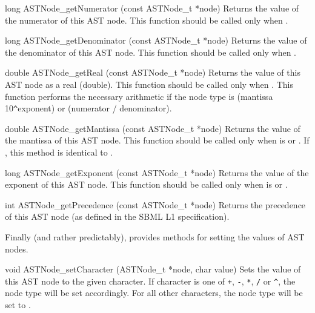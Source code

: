 \documentclass{sbmlmanual}
\begin{document}
\begin{methoddef}{long ASTNode\_getNumerator (const ASTNode\_t *node)}
  Returns the value of the numerator of this AST node.  This function
  should be called only when .
\end{methoddef}


\begin{methoddef}{long ASTNode\_getDenominator (const ASTNode\_t *node)}
  Returns the value of the denominator of this AST node.  This function
  should be called only when .
\end{methoddef}


\begin{methoddef}{double ASTNode\_getReal (const ASTNode\_t *node)}
  Returns the value of this AST node as a real (double).  This function
  should be called only when .
  This function performs the necessary arithmetic if the node type is
   (mantissa  10\verb|^|exponent) or 
  (numerator / denominator).
\end{methoddef}


\begin{methoddef}{double ASTNode\_getMantissa (const ASTNode\_t *node)}
  Returns the value of the mantissa of this AST node.  This function should
  be called only when  is 
  or .  If , this method is identical to
  .
\end{methoddef}


\begin{methoddef}{long ASTNode\_getExponent (const ASTNode\_t *node)}
  Returns the value of the exponent of this AST node.  This function should
  be called only when  is 
  or .
\end{methoddef}


\begin{methoddef}{int ASTNode\_getPrecedence (const ASTNode\_t *node)}
  Returns the precedence of this AST node (as defined in the SBML L1
  specification).
\end{methoddef}


Finally (and rather predictably), \libsbml{} provides methods for setting
the values of AST nodes.


\begin{methoddef}{void ASTNode\_setCharacter (ASTNode\_t *node, char value)}
  Sets the value of this AST node to the given character.  If character is
  one of \verb|+|, \verb|-|, \verb|*|, \verb|/| or \verb|^|, the node type
  will be set accordingly.  For all other characters, the node type will be
  set to .
\end{methoddef}
\end{document}
